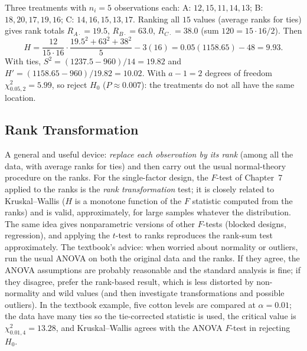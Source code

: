\begin{example}\label{ex:kw}
Three treatments with $n_i=5$ observations each: A: $12,15,11,14,13$; B: $18,20,17,19,16$; C: $14,16,15,13,17$. Ranking all $15$ values (average ranks for ties) gives rank totals $R_{A\cdot}=19.5$, $R_{B\cdot}=63.0$, $R_{C\cdot}=38.0$ (sum $120=15\cdot16/2$). Then
\[ H=\frac{12}{15\cdot16}\cdot\frac{19.5^2+63^2+38^2}5-3(16)=0.05(1158.65)-48=9.93. \]
With ties, $S^2=(1237.5-960)/14=19.82$ and $H'=(1158.65-960)/19.82=10.02$. With $a-1=2$ degrees of freedom $\chi^2_{0.05,2}=5.99$, so reject $H_0$ ($P\approx0.007$): the treatments do not all have the same location.
\end{example}

\subsection{Rank Transformation}

A general and useful device: \emph{replace each observation by its rank} (among all the data, with average ranks for ties) and then carry out the usual normal-theory procedure on the ranks. For the single-factor design, the $F$-test of Chapter~7 applied to the ranks is the \emph{rank transformation} test; it is closely related to Kruskal--Wallis ($H$ is a monotone function of the $F$ statistic computed from the ranks) and is valid, approximately, for large samples whatever the distribution. The same idea gives nonparametric versions of other $F$-tests (blocked designs, regression), and applying the $t$-test to ranks reproduces the rank-sum test approximately. The textbook's advice: when worried about normality or outliers, run the usual ANOVA on both the original data and the ranks. If they agree, the ANOVA assumptions are probably reasonable and the standard analysis is fine; if they disagree, prefer the rank-based result, which is less distorted by non-normality and wild values (and then investigate transformations and possible outliers). In the textbook example, five cotton levels are compared at $\alpha=0.01$; the data have many ties so the tie-corrected statistic is used, the critical value is $\chi^2_{0.01,4}=13.28$, and Kruskal--Wallis agrees with the ANOVA $F$-test in rejecting $H_0$.

